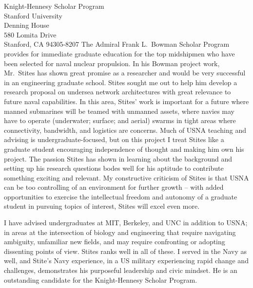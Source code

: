 \documentclass[10pt]{wrceletter}
\begin{document}
\begin{letter}{%
Knight-Hennesy Scholar Program\\
Stanford University\\
Denning House\\
580 Lomita Drive\\
Stanford, CA 94305-8207}
The Admiral Frank L.~Bowman Scholar Program provides for immediate graduate education for the top midshipmen who have been selected for naval nuclear propulsion. In his Bowman project work, Mr.~Stites has shown great promise as a researcher and would be very successful in an engineering graduate school. Stites sought me out to help him develop a research proposal on undersea network architectures with great relevance to future naval capabilities. In this area, Stites' work is important for a future where manned submarines will be teamed with unmanned assets, where navies may have to operate (underwater; surface; and aerial) swarms in tight areas where connectivity, bandwidth, and logistics are concerns. Much of USNA teaching and advising is undergraduate-focused, but on this project I treat Stites like a graduate student encouraging independence of thought and making him own his project. The passion Stites has shown in learning about the background and setting up his research questions bodes well for his aptitude to contribute something exciting and relevant. My constructive criticism of Stites is that USNA can be too controlling of an environment for further growth -- with added opportunities to exercise the intellectual freedom and autonomy of a graduate student in pursuing topics of interest, Stites will excel even more.

I have advised undergraduates at MIT, Berkeley, and UNC in addition to USNA; in areas at the intersection of biology and engineering that require navigating ambiguity, unfamiliar new fields, and may require confronting or adopting dissenting points of view. Stites ranks well in all of these. I served in the Navy as well, and Stite's Navy experience, in a US military experiencing rapid change and challenges, demonstrates his purposeful leadership and civic mindset. He is an outstanding candidate for the Knight-Hennesy Scholar Program.

\closing{~} %

\end{letter}
\end{document}
